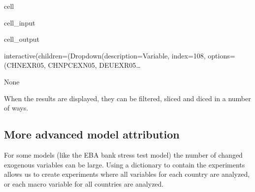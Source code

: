 \documentclass[letterpaper,10pt,english]{jupyterBook}
\begin{document}
\begin{sphinxuseclass}{cell}\begin{sphinxVerbatimInput}

\begin{sphinxuseclass}{cell_input}
\begin{sphinxVerbatim}[commandchars=\\\{\}]
\end{sphinxVerbatim}

\end{sphinxuseclass}\end{sphinxVerbatimInput}
\begin{sphinxVerbatimOutput}

\begin{sphinxuseclass}{cell_output}
\begin{sphinxVerbatim}[commandchars=\\\{\}]
interactive(children=(Dropdown(description=\PYGZsq{}Variable\PYGZsq{}, index=108, options=(\PYGZsq{}CHNEXR05\PYGZsq{}, \PYGZsq{}CHNPCEXN05\PYGZsq{}, \PYGZsq{}DEUEXR05…
\end{sphinxVerbatim}

\begin{sphinxVerbatim}[commandchars=\\\{\}]
None
\end{sphinxVerbatim}

\end{sphinxuseclass}\end{sphinxVerbatimOutput}

\end{sphinxuseclass}
\sphinxAtStartPar
When the results are displayed, they can be filtered, sliced and diced in a number of ways.


\subsection{More advanced model attribution}
\label{\detokenize{content/06_ModelAnalytics/Attribution:more-advanced-model-attribution}}
\sphinxAtStartPar
For some  models (like the EBA bank stress test model) the number of changed exogenous variables can be large. Using a dictionary to contain the experiments allows us to create experiments where all variables for each country are analyzed, or each macro variable for all countries are analyzed.
\end{document}
